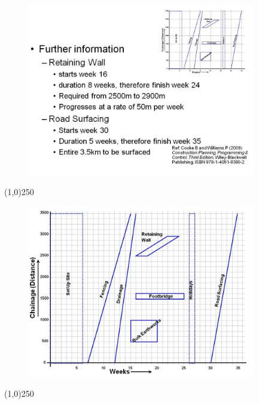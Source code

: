 \begin{frame}
\begin{figure}
	\centering
		\includegraphics[width = 10.0cm]{oldnotes/Slide309.jpg}
\end{figure}
\end{frame}
\begin{center}\line(1,0){250}\end{center}




\begin{frame}
\begin{figure}
	\centering
		\includegraphics[width = 10.0cm]{oldnotes/Slide310.jpg}
\end{figure}
\end{frame}
\begin{center}\line(1,0){250}\end{center}




